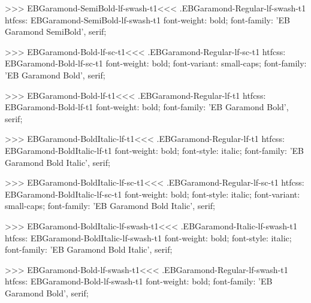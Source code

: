 {{{{{{{>>>
\<EBGaramond-SemiBold-lf-swash-t1\><<<
.EBGaramond-Regular-lf-swash-t1
htfcss:  EBGaramond-SemiBold-lf-swash-t1  font-weight: bold; font-family: 'EB Garamond SemiBold', serif;

>>>
\<EBGaramond-Bold-lf-sc-t1\><<<
.EBGaramond-Regular-lf-sc-t1
htfcss:  EBGaramond-Bold-lf-sc-t1  font-weight: bold; font-variant: small-caps; font-family: 'EB Garamond Bold', serif;

>>>
\<EBGaramond-Bold-lf-t1\><<<
.EBGaramond-Regular-lf-t1
htfcss:  EBGaramond-Bold-lf-t1  font-weight: bold; font-family: 'EB Garamond Bold', serif;

>>>
\<EBGaramond-BoldItalic-lf-t1\><<<
.EBGaramond-Regular-lf-t1
htfcss:  EBGaramond-BoldItalic-lf-t1  font-weight: bold; font-style: italic; font-family: 'EB Garamond Bold Italic', serif;

>>>
\<EBGaramond-BoldItalic-lf-sc-t1\><<<
.EBGaramond-Regular-lf-sc-t1
htfcss:  EBGaramond-BoldItalic-lf-sc-t1  font-weight: bold; font-style: italic; font-variant: small-caps; font-family: 'EB Garamond Bold Italic', serif;

>>>
\<EBGaramond-BoldItalic-lf-swash-t1\><<<
.EBGaramond-Italic-lf-swash-t1
htfcss:  EBGaramond-BoldItalic-lf-swash-t1  font-weight: bold; font-style: italic; font-family: 'EB Garamond Bold Italic', serif;

>>>
\<EBGaramond-Bold-lf-swash-t1\><<<
.EBGaramond-Regular-lf-swash-t1
htfcss:  EBGaramond-Bold-lf-swash-t1  font-weight: bold; font-family: 'EB Garamond Bold', serif;

}}}}}}}
